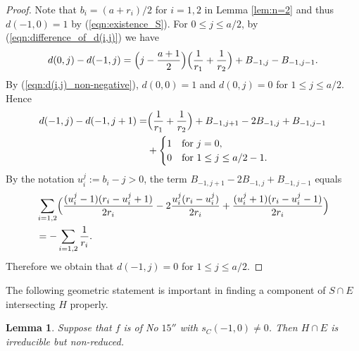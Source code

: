 \documentclass[a4paper,11pt]{amsart}
\newtheorem{lemma}[theorem]{Lemma}
\theoremstyle{definition}
\theoremstyle{remark}
\numberwithin{equation}{section}
\begin{document}
\begin{proof}
Note that $b_i=(a+r_i)/2$ for $i=1,2$ in Lemma \ref{lem:n=2}
and thus $d(-1,0)=1$ by (\ref{eqn:existence_S}).
For $0 \le j \le a/2$, by (\ref{eqn:difference_of_d(i,j)}) we have
\begin{align*}
d(0,j)-d(-1,j)=\Bigl(j-\frac{a+1}{2}\Bigr)
\Bigl(\frac{1}{r_1}+\frac{1}{r_2}\Bigr)+B_{-1,j}-B_{-1,j-1}.
\end{align*}
By (\ref{eqn:d(i,j)_non-negative}),
$d(0,0)=1$ and $d(0,j)=0$ for $1\le j\le a/2$. Hence
\begin{align*}
d(-1,j)-d(-1,j+1) =& \Bigl(\frac{1}{r_1}+\frac{1}{r_2}\Bigr)
+B_{-1,j+1}-2B_{-1,j}+B_{-1,j-1} \\
&+
\begin{cases}
1 & \textrm{for} \ j=0, \\
0 & \textrm{for} \ 1\le j\le a/2-1.
\end{cases}
\end{align*}
By the notation $u_i^j:=b_i-j>0$,
the term $B_{-1,j+1}-2B_{-1,j}+B_{-1,j-1}$ equals
\begin{align*}
& \sum_{i=1,2} \Bigl(\frac{(u_i^j-1)(r_i-u_i^j+1)}{2r_i}
-2\frac{u_i^j(r_i-u_i^j)}{2r_i}
+\frac{(u_i^j+1)(r_i-u_i^j-1)}{2r_i}\Bigr) \\
&= -\sum_{i=1,2}\frac{1}{r_i}.
\end{align*}
Therefore we obtain that $d(-1,j)=0$ for $1 \le j \le a/2$.
\end{proof}

The following geometric statement is important
in finding a component of $S \cap E$ intersecting $H$ properly.

\begin{lemma}\label{lem:irreducible}
Suppose that $f$ is of No $\textrm{15}''$ with $s_C(-1,0)\neq0$.
Then $H \cap E$ is irreducible but non-reduced.
\end{lemma}
\end{document}
